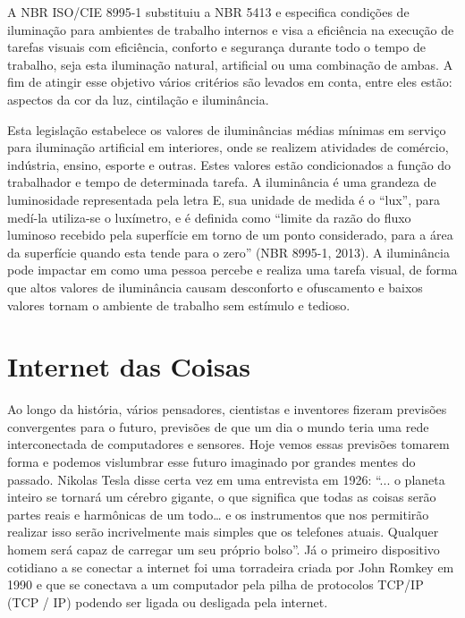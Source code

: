 A NBR ISO/CIE 8995-1 \cite{normabr} substituiu a NBR 5413 e especifica condições de iluminação para ambientes de trabalho internos e visa a eficiência na execução de tarefas visuais com eficiência, conforto e segurança durante todo o tempo de trabalho, seja esta iluminação natural, artificial ou uma combinação de ambas. A fim de atingir esse objetivo vários critérios são levados em conta, entre eles estão: aspectos da cor da luz, cintilação e iluminância.

Esta legislação estabelece os valores de iluminâncias médias mínimas em serviço para iluminação artificial em interiores, onde se realizem atividades de comércio, indústria, ensino, esporte e outras. Estes valores estão condicionados a função do trabalhador e tempo de determinada tarefa. A iluminância é uma grandeza de luminosidade representada pela letra E, sua unidade de medida é o “lux”, para medí-la utiliza-se o luxímetro, e é definida como  ``limite da razão do fluxo luminoso recebido pela superfície em torno de um ponto considerado, para a área da superfície quando esta tende para o zero'' (NBR 8995-1, 2013).  A iluminância pode impactar em como uma pessoa percebe e realiza uma tarefa visual, de forma que altos valores de iluminância causam desconforto e ofuscamento e baixos valores tornam o ambiente de trabalho sem estímulo e tedioso.


\section{Internet das Coisas}

Ao longo da história, vários pensadores, cientistas e inventores fizeram previsões convergentes para o futuro, previsões de que um dia o mundo teria uma rede interconectada de computadores e sensores. Hoje vemos essas previsões tomarem forma e podemos vislumbrar esse futuro imaginado por grandes mentes do passado. Nikolas Tesla disse certa vez em uma entrevista em 1926: ``... o planeta inteiro se tornará um cérebro gigante, o que significa que todas as coisas serão partes reais e harmônicas de um todo… e os instrumentos que nos permitirão realizar isso serão incrivelmente mais simples que os telefones atuais. Qualquer homem será capaz de carregar um seu próprio bolso''. Já o primeiro dispositivo cotidiano a se conectar a internet foi uma torradeira criada por John Romkey em 1990 e que se conectava a um computador pela pilha de protocolos TCP/IP (\acl{TCP} / \acl{IP}) podendo ser ligada ou desligada pela internet.

